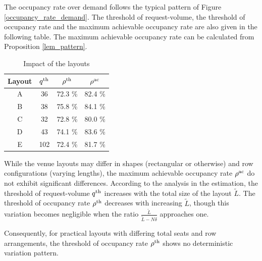 The occupancy rate over demand follows the typical pattern of Figure \ref{occupancy_rate_demand}. The threshold of request-volume, the threshold of occupancy rate and the maximum achievable occupancy rate are also given in the following table. The maximum achievable occupancy rate can be calculated from Proposition \ref{lem_pattern}.

\begin{table}[ht]
  \centering
  \caption{Impact of the layouts}
  \begin{tabular}{cccc}
  \hline
  \hline
   Layout & $q^{\textup{th}}$ & $\rho^{\textup{th}}$ & $\rho^{\textup{ac}}$ \\
  \hline
   A & 36 & 72.3 \% & 82.4 \% \\
   B & 38 & 75.8 \% & 84.1 \% \\
   C & 32 & 72.8 \% & 80.0 \% \\
   D & 43 & 74.1 \%  & 83.6 \% \\
   E & 102 & 72.4 \% & 81.7 \% \\
   \hline
   \hline
  \end{tabular}
\end{table}

While the venue layouts may differ in shapes (rectangular or otherwise) and row configurations (varying lengths), the maximum achievable occupancy rate $\rho^{\textup{ac}}$ do not exhibit significant differences. According to the analysis in the estimation, the threshold of request-volume $q^{\textup{th}}$ increases with the total size of the layout $\tilde{L}$. The threshold of occupancy rate $\rho^{\textup{th}}$ decreases with increasing $\tilde{L}$, though this variation becomes negligible when the ratio $\frac{\tilde{L}}{\tilde{L}-N\delta}$ approaches one. 

Consequently, for practical layouts with differing total seats and row arrangements, the threshold of occupancy rate $\rho^{\textup{th}}$ shows no deterministic variation pattern.


